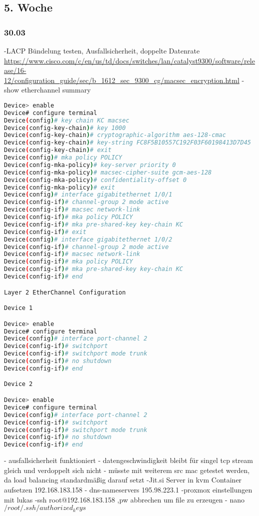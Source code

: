 \documentclass[english,runningheads,a4paper]{llncs}[2018/03/10]
\begin{document}
\subsection{5. Woche}
\subsubsection{30.03}
-LACP Bündelung testen, Ausfallsicherheit, doppelte Datenrate \url{https://www.cisco.com/c/en/us/td/docs/switches/lan/catalyst9300/software/release/16-12/configuration_guide/sec/b_1612_sec_9300_cg/macsec_encryption.html}
-show etherchannel summary
\begin{lstlisting}[language=bash]
Device> enable
Device# configure terminal
Device(config)# key chain KC macsec
Device(config-key-chain)# key 1000
Device(config-key-chain)# cryptographic-algorithm aes-128-cmac
Device(config-key-chain)# key-string FC8F5B10557C192F03F60198413D7D45
Device(config-key-chain)# exit
Device(config)# mka policy POLICY
Device(config-mka-policy)# key-server priority 0
Device(config-mka-policy)# macsec-cipher-suite gcm-aes-128
Device(config-mka-policy)# confidentiality-offset 0
Device(config-mka-policy)# exit
Device(config)# interface gigabitethernet 1/0/1
Device(config-if)# channel-group 2 mode active
Device(config-if)# macsec network-link
Device(config-if)# mka policy POLICY
Device(config-if)# mka pre-shared-key key-chain KC
Device(config-if)# exit
Device(config)# interface gigabitethernet 1/0/2
Device(config-if)# channel-group 2 mode active
Device(config-if)# macsec network-link
Device(config-if)# mka policy POLICY
Device(config-if)# mka pre-shared-key key-chain KC
Device(config-if)# end

Layer 2 EtherChannel Configuration

Device 1

Device> enable
Device# configure terminal
Device(config)# interface port-channel 2
Device(config-if)# switchport
Device(config-if)# switchport mode trunk
Device(config-if)# no shutdown
Device(config-if)# end

Device 2

Device> enable
Device# configure terminal
Device(config)# interface port-channel 2
Device(config-if)# switchport
Device(config-if)# switchport mode trunk
Device(config-if)# no shutdown
Device(config-if)# end
\end{lstlisting}
- ausfallsicherheit funktioniert
- datengeschwindigkeit bleibt für singel tcp stream gleich und verdoppelt sich nicht
- müsste mit weiterem src mac getestet werden, da load balancing standardmäßig darauf setzt
-Jit.si Server in kvm Container aufsetzen 192.168.183.158
- dns-nameservers 195.98.223.1
-proxmox einstellungen mit lukas
-ssh root@192.168.183.158 ,pw abbrechen um file zu erzeugen
- nano $/root/.ssh/authorized_keys$
\end{document}
